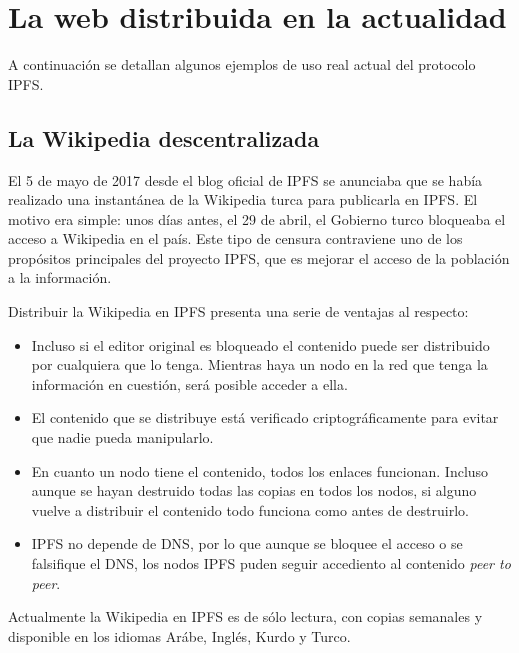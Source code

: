 \documentclass[12pt]{article} %
\begin{document}


\section{La web distribuida en la actualidad} %
\label{sec:la_web_distribuida_en_la_actualidad}

A continuación se detallan algunos ejemplos de uso real actual del protocolo IPFS. 

\subsection{La Wikipedia descentralizada} %
\label{sub:la_wikipedia_descentralizada}

El 5 de mayo de 2017 desde el blog oficial de IPFS se anunciaba que se había realizado una instantánea de la Wikipedia turca para publicarla en IPFS. El motivo era simple: unos días antes, el 29 de abril, el Gobierno turco bloqueaba el acceso a Wikipedia en el país. Este tipo de censura contraviene uno de los propósitos principales del proyecto IPFS, que es mejorar el acceso de la población a la información.

Distribuir la Wikipedia en IPFS presenta una serie de ventajas al respecto:
\begin{itemize}
	\item Incluso si el editor original es bloqueado el contenido puede ser distribuido por cualquiera que lo tenga. Mientras haya un nodo en la red que tenga la información en cuestión, será posible acceder a ella.
	\item El contenido que se distribuye está verificado criptográficamente para evitar que nadie pueda manipularlo.
	\item En cuanto un nodo tiene el contenido, todos los enlaces funcionan. Incluso aunque se hayan destruido todas las copias en todos los nodos, si alguno vuelve a distribuir el contenido todo funciona como antes de destruirlo.
	\item IPFS no depende de DNS, por lo que aunque se bloquee el acceso o se falsifique el DNS, los nodos IPFS puden seguir accediento al contenido \textit{peer to peer}.
\end{itemize}

Actualmente la Wikipedia en IPFS es de sólo lectura, con copias semanales y disponible en los idiomas Arábe, Inglés, Kurdo y Turco.
\end{document}
